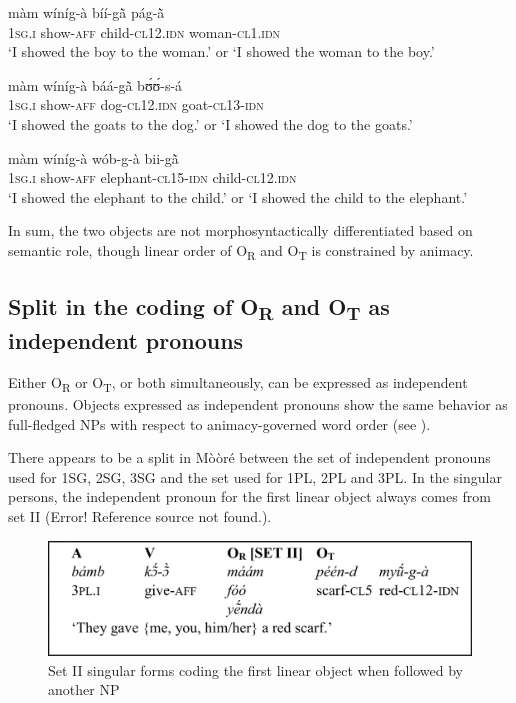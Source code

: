 \documentclass[output=paper]{langsci/langscibook}
\begin{document}
\ea
\label{ex:16.pacchiarotti}
\gll m\`{a}m    w\'{i}n\'{i}g-\`{a}    b\'{i}\'{i}-g\`{\~{a}}      p\'{a}g-\`{\~{a}} \\
\textsc{1sg.i  }  show-\textsc{aff}    child-\textsc{cl12.idn}  woman-\textsc{cl1.idn}\\
\glt`I showed the boy to the woman.' or `I showed the woman to the boy.'
\z

\ea
\label{ex:17.pacchiarotti}
\gll m\`{a}m    w\'{i}n\'{i}g-\`{a}    b\'{a}\'{a}-g\`{\~{a}}    bʊ́ʊ́-s-\'{a} \\
\textsc{1sg.i  }  show-\textsc{aff}    dog-\textsc{cl12.idn}  goat-\textsc{cl13-idn}\\
\glt`I showed the goats to the dog.' or `I showed the dog to the goats.'  
\z

\ea
\label{ex:18.pacchiarotti}
\gll m\`{a}m    w\'{i}n\'{i}g-\`{a}    w\'{o}b-g-\`{a}    bii-g\`{\~{a}} \\
\textsc{1sg.i  }  show-\textsc{aff}    elephant-\textsc{cl15-idn}  child-\textsc{cl12.idn}\\
\glt `I showed the elephant to the child.' or `I showed the child to the elephant.'
\z

In sum, the two objects are not morphosyntactically differentiated based on semantic role, though linear order of O\textsubscript{R} and O\textsubscript{T} is constrained by animacy.

\subsection{Split in the coding of O\textsubscript{R} and O\textsubscript{T} as independent pronouns}\label{§4.3:split.pacchiarotti}

Either O\textsubscript{R} or O\textsubscript{T}, or both simultaneously, can be expressed as independent pronouns. Objects expressed as independent pronouns show the same behavior as full-fledged NPs with respect to animacy-governed word order (see ). 

There appears to be a split in M\`{o}\`{o}r\'{e} between the set of independent pronouns used for 1SG, 2SG, 3SG and the set used for 1PL, 2PL and 3PL. In the singular persons, the independent pronoun for the first linear object always comes from set II (Error! Reference source not found.). 

\begin{figure}[h]
\includegraphics[width=\textwidth]{figures/pacchiarottifig1}
\caption{Set II singular forms coding the first linear object when followed by another NP}
\label{fig:1.pacchiarotti}
\end{figure}
\end{document}
